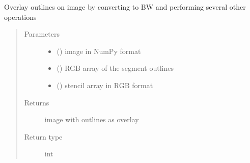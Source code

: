 \documentclass[letterpaper,10pt,english]{sphinxmanual}
\begin{document}
\begin{fulllineitems}
\label{\detokenize{createregions:createregions.overlay_outlines_on_image}}
Overlay outlines on image by converting to BW and performing several other operations
\begin{quote}\begin{description}
\item[{Parameters}] \leavevmode\begin{itemize}
\item {} 
 () \textendash{} image in NumPy format

\item {} 
 () \textendash{} RGB array of the segment outlines

\item {} 
 () \textendash{} stencil array in RGB format

\end{itemize}

\item[{Returns}] \leavevmode
image with outlines as overlay

\item[{Return type}] \leavevmode
int

\end{description}\end{quote}

\end{fulllineitems}

\end{document}
